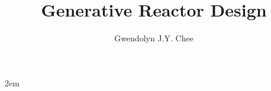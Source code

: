 \documentclass[edeposit,fullpage,12pt]{uiucthesis2009}
\title{Generative Reactor Design}
\author{Gwendolyn J.Y. Chee}
\begin{document}

%
\justify
\parindent 2em%

%

%
\tableofcontents

%

%

%



%

\mainmatter

%
	






%
%

\backmatter

%


\end{document}
